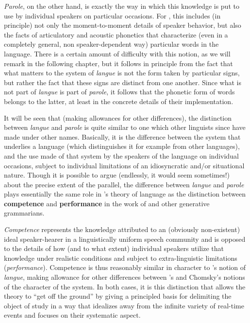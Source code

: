 \emph{Parole}, on the other hand, is exactly the way in which this
knowledge is put to use by individual speakers on particular
occasions.  For {\Saussure}, this includes (in principle) not only the
moment-to-moment details of speaker behavior, but also the facts of
articulatory and acoustic phonetics that characterize (even in a
completely general, non speaker-dependent way) particular words in the
language.  There is a certain amount of difficulty with this notion,
as we will remark in the following chapter, but it follows in
principle from the fact that what matters to the system of
\emph{langue} is not the form taken by particular signs, but
rather the fact that these signs are distinct from one another.  Since
what is not part of \emph{langue} is part of \emph{parole}, it
follows that the phonetic form of words belongs to the latter, at
least in the concrete details of their implementation.

It will be seen that (making allowances for other differences), the
distinction between \emph{langue} and \emph{parole} is quite similar
to one which other linguists since {\Saussure} have made under other
names.  Basically, it is the difference between the system that
underlies a language (which distinguishes it for example from other
languages), and the use made of that system by the speakers of the
language on individual occasions, subject to individual limitations of
an idiosyncratic and/or situational nature. Though it is possible to
argue (endlessly, it would seem sometimes!)  about the precise extent
of the parallel, the difference between \emph{langue} and
\emph{parole} plays essentially the same role in {\Saussure}'s theory of
language as the distinction between \textbf{competence} and
\textbf{performance} in the work of {\Chomsky} and other generative
grammarians.

\emph{Competence} represents the knowledge attributed to an
(obviously non-exist\-ent) ideal speaker-hearer in a linguistically
uniform speech community and is opposed to the details of how (and to
what extent) individual speakers utilize that knowledge under
realistic conditions and subject to extra-linguistic limitations
(\emph{performance}).  Competence is thus reasonably similar in
character to {\Saussure}'s notion of \emph{langue}, making allowance
for other differences between {\Saussure}'s and Chomsky's notions of the
character of the system.  In both cases, it is this distinction that
allows the theory to ``get off the ground'' by giving a principled
basis for delimiting the object of study in a way that idealizes away
from the infinite variety of real-time events and focuses on their
systematic aspect.

